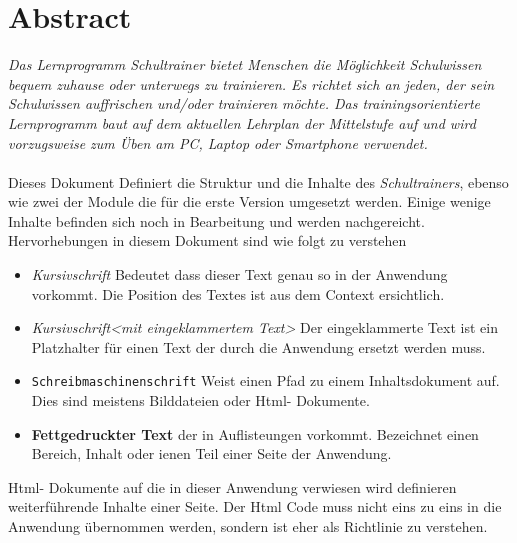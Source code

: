 \chapter{ Abstract }
\label{cha:abstract}
\emph{Das Lernprogramm \emph{Schultrainer} bietet Menschen die Möglichkeit Schulwissen
bequem zuhause oder unterwegs zu trainieren.
Es richtet sich an jeden, der sein Schulwissen auffrischen
und/oder trainieren möchte. Das trainingsorientierte Lernprogramm baut auf dem
aktuellen Lehrplan der Mittelstufe auf und wird vorzugsweise zum Üben am PC,
Laptop oder Smartphone verwendet.}
\\
\\
  Dieses Dokument Definiert die Struktur und die Inhalte des \emph{Schultrainers}, ebenso wie
zwei der Module die für die erste Version umgesetzt werden. Einige wenige Inhalte befinden sich noch in Bearbeitung und werden nachgereicht. Hervorhebungen in diesem Dokument sind wie folgt zu verstehen
\begin{itemize}
  \item \emph{Kursivschrift} Bedeutet dass dieser Text genau so in der Anwendung vorkommt. Die Position des Textes ist aus dem Context ersichtlich.
  \item \emph{Kursivschrift<mit eingeklammertem Text>} Der eingeklammerte Text ist ein Platzhalter für einen Text der durch die Anwendung ersetzt werden muss.
 \item \texttt{Schreibmaschinenschrift} Weist einen Pfad zu einem Inhaltsdokument auf. Dies sind meistens Bilddateien oder Html- Dokumente. 
 \item \textbf{Fettgedruckter Text} der in Auflisteungen vorkommt. Bezeichnet einen Bereich, Inhalt oder ienen Teil einer Seite der Anwendung.
\end{itemize}
Html- Dokumente auf die in dieser Anwendung verwiesen wird definieren weiterführende Inhalte einer Seite. Der Html Code muss nicht eins zu eins in die Anwendung übernommen werden, sondern ist eher als Richtlinie zu verstehen.
